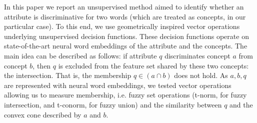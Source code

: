 In this paper we report an unsupervised method aimed to identify whether an attribute is discriminative for two words (which are treated as concepts, in our particular case). To this end, we use geometrically inspired vector operations underlying unsupervised decision functions. These decision functions operate on state-of-the-art neural word embeddings of the attribute and the concepts. The main idea can be described as follows: if attribute $q$ discriminates concept $a$ from concept $b$, then $q$ is excluded from the feature set shared by these two concepts: the intersection. That is, the membership $q\in (a\cap b)$ does not hold. As $a,b,q$ are represented with neural word embeddings, we tested vector operations allowing us to measure membership, i.e. fuzzy set operations (t-norm, for fuzzy intersection, and t-conorm, for fuzzy union) and the similarity between $q$ and the convex cone described by $a$ and $b$.

